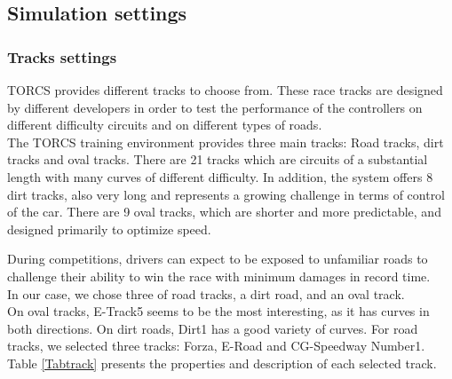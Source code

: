 \documentclass{llncs}
\begin{document}
\subsection{Simulation settings}

\subsubsection{Tracks settings}

TORCS provides different tracks to choose from. These race tracks are designed by different developers in order to test the performance of the controllers on different difficulty circuits and on different types of roads.\\

The TORCS training environment provides three main tracks: Road tracks, dirt tracks and oval tracks.
There are 21 tracks which are circuits of a substantial length with many curves of different difficulty. In addition, the system offers 8 dirt tracks, also very long and represents a growing challenge in terms of control of the car. There are 9 oval tracks, which are shorter and more predictable, and designed primarily to optimize speed.

During competitions, drivers can expect to be exposed to unfamiliar roads to challenge their ability to win the race with minimum damages in record time.\\

In our case, we chose three of road tracks, a dirt road, and an oval track.\\


On oval tracks, E-Track5 seems to be the most interesting, as it has curves in both directions. On dirt roads, Dirt1 has a good variety of curves. For road tracks, we selected three tracks: Forza, E-Road and CG-Speedway Number1. Table \ref{Tabtrack}  presents the properties and description of each selected track.\\
\end{document}
